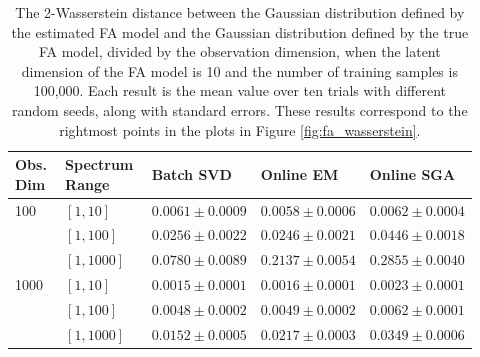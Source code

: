 \documentclass[msc,deptreport.inf]{infthesis} %
\begin{document}
\begin{table}[h!]
	\begin{center}
		\begin{tabular}{|| p{0.12\linewidth} p{0.20\linewidth} p{0.20\linewidth} p{0.20\linewidth} p{0.20\linewidth} ||} 
 			\hline
 			Obs. Dim & Spectrum Range & Batch SVD & Online EM & Online SGA \\ [0.5ex] 
 			\hline\hline
			100 	& $[1, 10]$ 	& $0.0061 \pm 0.0009$ 	& $0.0058 \pm 0.0006$ 	& $0.0062 \pm 0.0004$ \\ 
				& $[1, 100]$ 	& $0.0256 \pm 0.0022$ 	& $0.0246 \pm 0.0021$ 	& $0.0446 \pm 0.0018$ \\ 
				& $[1, 1000]$	& $0.0780 \pm 0.0089$ 	& $0.2137 \pm 0.0054$ 	& $0.2855 \pm 0.0040$ \\ 
			\hline
			1000	& $[1, 10]$ 	& $0.0015 \pm 0.0001$ 	& $0.0016 \pm 0.0001$ 	& $0.0023 \pm 0.0001$ \\ 
				& $[1, 100]$ 	& $0.0048 \pm 0.0002$ 	& $0.0049 \pm 0.0002$ 	& $0.0062 \pm 0.0001$ \\ 
				& $[1, 1000]$ 	& $0.0152 \pm 0.0005$ 	& $0.0217 \pm 0.0003$ 	& $0.0349 \pm 0.0006$ \\ [1ex] 
			\hline
		\end{tabular}
		\caption{The 2-Wasserstein distance between the Gaussian distribution defined by the estimated FA model and the Gaussian distribution defined by the true FA model, divided by the observation dimension, when the latent dimension of the FA model is 10 and the number of training samples is 100,000. Each result is the mean value over ten trials with different random seeds, along with standard errors. These results correspond to the rightmost points in the plots in Figure \ref{fig:fa_wasserstein}.}
		\label{table:fa_wasserstein}
	\end{center}
\end{table}
\end{document}
